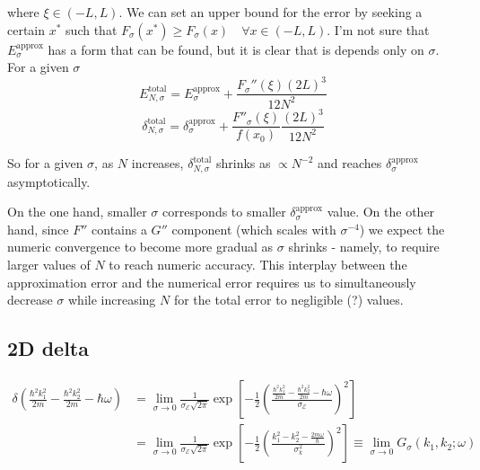 where $\xi\in(-L,L)$. We can set an upper bound for the error by seeking a certain $x^{*}$ such that $F_{\sigma}(x^{*})\geq F_{\sigma}(x) \quad \forall x\in(-L,L)$. I'm not sure that $E_{\sigma}^{\text{approx}}$ has a form that can be found, but it is clear that is depends only on $\sigma$. For a given $\sigma$
\begin{equation}
E^{\text{total}}_{N,\sigma} = E_{\sigma}^{\text{approx}} + \frac{F_{\sigma}''(\xi)(2L)^{3}}{12N^{2}}
\label{eq:delta_total_error_bound}
\end{equation}
\begin{equation}
\delta_{N,\sigma}^{\text{total}}=\delta^{\text{approx}}_{\sigma} + \frac{F''_{\sigma}(\xi)}{f(x_{0})} \frac{(2L)^{3}}{12N^{2}}
\label{eq:delta_relative_error_bound}
\end{equation}

So for a given $\sigma$, as $N$ increases, $\delta_{N,\sigma}^{\text{total}}$ shrinks as $\propto N^{-2}$ and reaches $\delta^{\text{approx}}_{\sigma}$ asymptotically.

On the one hand, smaller $\sigma$ corresponds to smaller $\delta^{\text{approx}}_{\sigma}$ value. On the other hand, since $F''$ contains a $G''$ component (which scales with $\sigma^{-4}$) we expect the numeric convergence to become more gradual as $\sigma$ shrinks - namely, to require larger values of $N$ to reach numeric accuracy. This interplay between the approximation error and the numerical error requires us to simultaneously decrease $\sigma$ while increasing $N$ for the total error to negligible (?) values.

\newpage
\subsection{2D delta}

\begin{align}
\delta\left( \frac{\hbar^{2} k_{1}^{2}}{2m}-\frac{\hbar^{2} k_{2}^{2}}{2m} -\hbar\omega\right) &= \lim\limits_{\sigma\to 0} \frac{1}{\sigma_{\mathcal{E}}\sqrt{ 2\pi }} \exp\left[-\frac{1}{2} \left(\frac{\frac{\hbar^{2} k_{1}^{2}}{2m}-\frac{\hbar^{2} k_{2}^{2}}{2m} -\hbar\omega}{\sigma_{\mathcal{E}}} \right)^{2} \right] \\
&= \lim\limits_{\sigma\to 0} \frac{1}{\sigma_{\mathcal{E}}\sqrt{ 2\pi }} \exp\left[-\frac{1}{2} \left(\frac{k_{1}^{2}- k_{2}^{2} -\frac{2m\omega}{\hbar}}{\sigma_{k}^{2}} \right)^{2} \right] \equiv \lim\limits_{\sigma\to 0} G_{\sigma}(k_{1}, k_{2};\omega)
\label{eq:delta_2d_gaussian}
\end{align}

